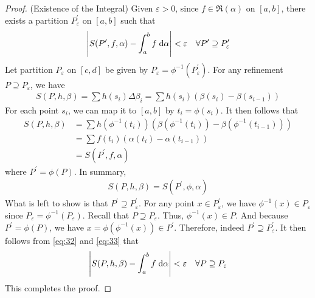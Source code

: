 \documentclass[thmcnt=section, 12pt]{my-elegantbook}
\begin{document}
\begin{proof}
    \par (Existence of the Integral) Given $\varepsilon > 0$, since $f \in \mathfrak{R}(\alpha)$ on $[a, b]$, there exists a partition $P^\prime_\varepsilon$ on $[a, b]$ such that
    \begin{align}
        \left\lvert S(P^\prime, f, \alpha) - \int_a^b f \; \mathrm{d}\alpha \right\rvert < \varepsilon
        \quad \forall P^\prime \supseteq P^\prime_\varepsilon
        \label{eq:32}
    \end{align}
    Let partition $P_\varepsilon$ on $[c, d]$ be given by $P_\varepsilon = \phi^{-1}(P^\prime_\varepsilon)$. For any refinement $P \supseteq P_\varepsilon$, we have
    \begin{align*}
        S(P, h, \beta)
        = \sum h(s_i) \Delta\beta_i
        = \sum h(s_i) (\beta(s_i) - \beta(s_{i-1}))
    \end{align*}
    For each point $s_i$, we can map it to $[a, b]$ by $t_i = \phi(s_i)$. It then follows that
    \begin{align*}
        S(P, h, \beta)
         & = \sum h(\phi^{-1}(t_i)) (\beta(\phi^{-1}(t_i)) - \beta(\phi^{-1}(t_{i-1}))) \\
         & = \sum f(t_i) (\alpha(t_i) - \alpha(t_{i-1}))                                \\
         & = S(P^\prime, f, \alpha)
    \end{align*}
    where $P^\prime = \phi(P)$. In summary,
    \begin{align}
        S(P, h, \beta) = S(P^\prime, \phi, \alpha)
        \label{eq:33}
    \end{align}
    What is left to show is that $P^\prime \supseteq P^\prime_\varepsilon$. For any point $x \in P^\prime_\varepsilon$, we have $\phi^{-1}(x) \in P_\varepsilon$ since $P_\varepsilon = \phi^{-1}(P_\varepsilon)$. Recall that $P \supseteq P_\varepsilon$. Thus, $\phi^{-1}(x) \in P$. And because $P^\prime = \phi(P)$, we have $x = \phi(\phi^{-1}(x)) \in P^\prime$. Therefore, indeed $P^\prime \supseteq P^\prime_\varepsilon$. It then follows from \eqref{eq:32} and \eqref{eq:33} that
    \begin{align*}
        \left\lvert S(P, h, \beta) - \int_a^b f \; \mathrm{d}\alpha \right\rvert < \varepsilon
        \quad \forall P \supseteq P_\varepsilon
    \end{align*}
    This completes the proof.
\end{proof}



\end{document}
